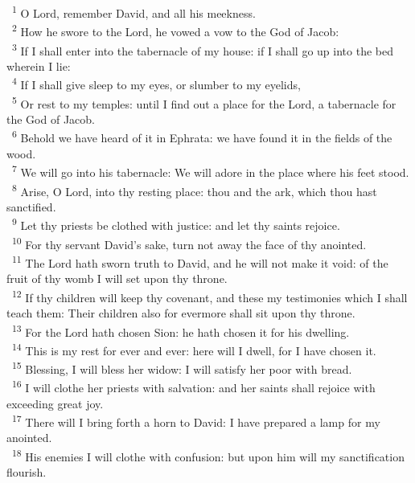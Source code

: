 \documentclass[a5paper,12pt]{article}
\begin{document}
\begin{multicols*}{2}
~\textsuperscript{1} O Lord, remember David, and all his meekness.\\
~\textsuperscript{2} How he swore to the Lord, he vowed a vow to the God of Jacob:\\
~\textsuperscript{3} If I shall enter into the tabernacle of my house: if I shall go up into the bed wherein I lie:\\
~\textsuperscript{4} If I shall give sleep to my eyes, or slumber to my eyelids,\\
~\textsuperscript{5} Or rest to my temples: until I find out a place for the Lord, a tabernacle for the God of Jacob.\\
~\textsuperscript{6} Behold we have heard of it in Ephrata: we have found it in the fields of the wood.\\
~\textsuperscript{7} We will go into his tabernacle: We will adore in the place where his feet stood.\\
~\textsuperscript{8} Arise, O Lord, into thy resting place: thou and the ark, which thou hast sanctified.\\
~\textsuperscript{9} Let thy priests be clothed with justice: and let thy saints rejoice.\\
~\textsuperscript{10} For thy servant David's sake, turn not away the face of thy anointed.\\
~\textsuperscript{11} The Lord hath sworn truth to David, and he will not make it void: of the fruit of thy womb I will set upon thy throne.\\
~\textsuperscript{12} If thy children will keep thy covenant, and these my testimonies which I shall teach them: Their children also for evermore shall sit upon thy throne.\\
~\textsuperscript{13} For the Lord hath chosen Sion: he hath chosen it for his dwelling.\\
~\textsuperscript{14} This is my rest for ever and ever: here will I dwell, for I have chosen it.\\
~\textsuperscript{15} Blessing, I will bless her widow: I will satisfy her poor with bread.\\
~\textsuperscript{16} I will clothe her priests with salvation: and her saints shall rejoice with exceeding great joy.\\
~\textsuperscript{17} There will I bring forth a horn to David: I have prepared a lamp for my anointed.\\
~\textsuperscript{18} His enemies I will clothe with confusion: but upon him will my sanctification flourish.\\


\end{multicols*}
\end{document}
